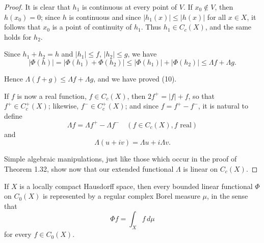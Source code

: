 \begin{proof}
  It is clear that $h_1$ is continuous at every point of $V$. If $x_0 \notin V$, then $h(x_0) = 0$; since $h$ is continuous and since $|h_1(x)| \leq |h(x)|$ for all $x \in X$, it follows that $x_0$ is a point of continuity of $h_1$. Thus $h_1 \in C_c(X)$, and the same holds for $h_2$.

  Since $h_1 + h_2 = h$ and $|h_1| \leq f$, $|h_2| \leq g$, we have
  \begin{equation}
    |\Phi(h)| = |\Phi(h_1) + \Phi(h_2)| \leq |\Phi(h_1)| + |\Phi(h_2)| \leq \Lambda f + \Lambda g.
  \end{equation}

  Hence $\Lambda(f + g) \leq \Lambda f + \Lambda g$, and we have proved (10).

  If $f$ is now a real function, $f \in C_c(X)$, then $2f^+ = |f| + f$, so that $f^+ \in C_c^+(X)$; likewise, $f^- \in C_c^+(X)$; and since $f = f^+ - f^-$, it is natural to define
  \begin{equation}
    \Lambda f = \Lambda f^+ - \Lambda f^- \quad (f \in C_c(X), f \text{ real}) \tag{13}
  \end{equation}
  and
  \begin{equation}
    \Lambda(u + iv) = \Lambda u + i\Lambda v. \tag{14}
  \end{equation}

  Simple algebraic manipulations, just like those which occur in the proof of Theorem 1.32, show now that our extended functional $\Lambda$ is linear on $C_c(X)$.
\end{proof}

\begin{theorem}[Rudin 6.19]
  If $X$ is a locally compact Hausdorff space, then every bounded linear functional $\Phi$ on $C_0(X)$ is represented by a regular complex Borel measure $\mu$, in the sense that
  \begin{equation}
    \Phi f = \int_X f \, d\mu \tag{1}
  \end{equation}
  for every $f \in C_0(X)$.
\end{theorem}

